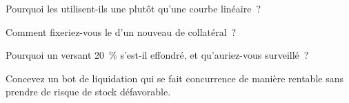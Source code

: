 \begin{interviewq}\label{iq:m3:defi-credit-and-leverage:3}
Pourquoi les  utilisent-ils une  plutôt qu'une courbe linéaire~?
\end{interviewq}

\begin{interviewq}\label{iq:m3:defi-credit-and-leverage:4}
Comment fixeriez-vous le  d'un nouveau  de collatéral~?
\end{interviewq}

\begin{interviewq}\label{iq:m3:defi-credit-and-leverage:5}
Pourquoi un  versant 20~\% s'est-il effondré, et qu'auriez-vous surveillé~?
\end{interviewq}

\begin{interviewq}\label{iq:m3:defi-credit-and-leverage:6}
Concevez un bot de liquidation qui se fait concurrence de manière rentable sans prendre de risque de stock défavorable.
\end{interviewq}
